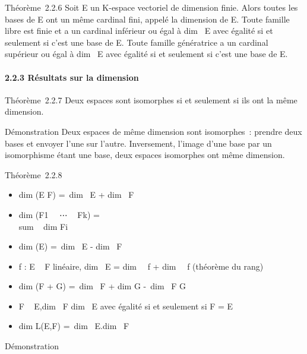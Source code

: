 Théorème~2.2.6 Soit E un K-espace vectoriel de dimension finie. Alors
toutes les bases de E ont un même cardinal fini, appelé la dimension de
E. Toute famille libre est finie et a un cardinal inférieur ou égal à
dim~ E avec égalité si et seulement si c'est
une base de E. Toute famille génératrice a un cardinal supérieur ou égal
à dim~ E avec égalité si et seulement si c'est
une base de E.

\paragraph{2.2.3 Résultats sur la dimension}

Théorème~2.2.7 Deux espaces sont isomorphes si et seulement si ils ont
la même dimension.

Démonstration Deux espaces de même dimension sont isomorphes~: prendre
deux bases et envoyer l'une sur l'autre. Inversement, l'image d'une base
par un isomorphisme étant une base, deux espaces isomorphes ont même
dimension.

Théorème~2.2.8

\begin{itemize}
\itemsep1pt\parskip0pt
\item
  dim (E \times F) =\ dim~
  E + dim~ F
\item
  dim (F1~
  \oplus~⋯ \oplus~ Fk)
  = \\sum ~
  dim Fi~
\item
   dim (E\diagupF) =\ dim~ E
  - dim~ F
\item
  f : E \rightarrow~ F linéaire, dim~ E
  = dim~
  \mathrmKer~f
  + dim~
  \mathrmIm~f (théorème du
  rang)
\item
  dim (F + G) =\ dim~
  F + dim G -\ dim~ F
  \bigcap G
\item
  F \subset~ E,\quad dim~ F
  \leq dim~ E avec égalité si et seulement si F =
  E
\item
  dim L(E,F) =\ dim~
  E.dim~ F
\end{itemize}

Démonstration


